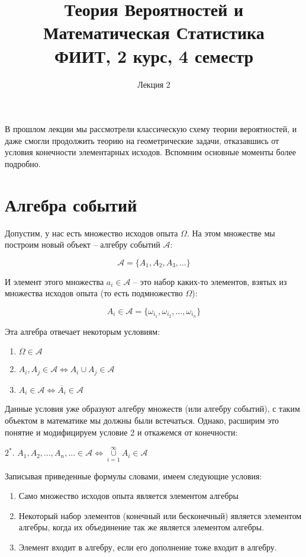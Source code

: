 \documentclass{article}
\title{Теория Вероятностей и Математическая Статистика\\
ФИИТ, 2 курс, 4 семестр}
\author{Лекция 2}
\begin{document}
\maketitle

В прошлом лекции мы рассмотрели классическую схему теории вероятностей, и даже смогли продолжить теорию на геометрические задачи, отказавшись от условия конечности элементарных исходов. Вспомним основные моменты более подробно.

\section{Алгебра событий}

Допустим, у нас есть множество исходов опыта $\Omega$. На этом множестве мы построим новый объект -- алгебру событий $\mathcal{A}$:

$$ \mathcal{A} = \{A_1, A_2, A_3, \ldots\} $$

И элемент этого множества $a_i \in \mathcal{A}$ -- это набор каких-то элементов, взятых из множества исходов опыта (то есть подмножество $\Omega$):

$$ A_i \in \mathcal{A} = \{ \omega_{i_1}, \omega_{i_2}, \ldots, \omega_{i_n}\} $$

Эта алгебра отвечает некоторым условиям:

\begin{enumerate}
\item $\Omega \in \mathcal{A}$

\item $ A_i, A_j \in \mathcal {A} \Leftrightarrow A_i \cup A_j \in \mathcal{A}$

\item $ A_i \in \mathcal{A} \Leftrightarrow \overline{A_i} \in \mathcal{A} $
\end{enumerate}

Данные условия уже образуют алгебру множеств (или алгебру событий), с таким объектом в математике мы должны были встечаться. Однако, расширим это понятие и модифицируем условие 2 и откажемся от конечности:

\quad

$2^*$. $ A_1, A_2, \ldots, A_n, \ldots \in \mathcal{A} \Leftrightarrow \cup\limits_{i = 1}^{\infty} A_i \in \mathcal{A}$

\quad

Записывая приведенные формулы словами, имеем следующие условия:

\begin{enumerate}
\item Само множество исходов опыта является элементом алгебры
\item Некоторый набор элементов (конечный или бесконечный) является элементом алгебры, когда их объединение так же является элементом алгебры.
\item Элемент входит в алгебру, если его дополнение тоже входит в алгебру.
\end{enumerate}
\end{document}
